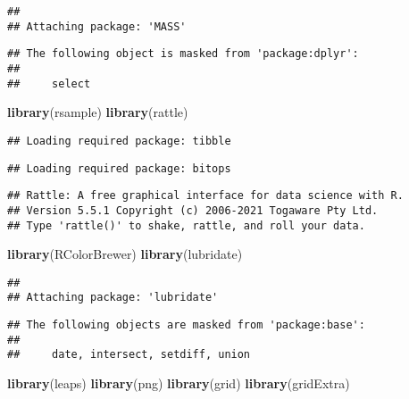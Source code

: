 \documentclass[
  a3paper,
]{article}
\newenvironment{Shaded}{\begin{snugshade}}{\end{snugshade}}
\newcommand{\FunctionTok}[1]{\textcolor[rgb]{0.13,0.29,0.53}{\textbf{#1}}}
\newcommand{\NormalTok}[1]{#1}
\begin{document}
\begin{verbatim}
## 
## Attaching package: 'MASS'
\end{verbatim}

\begin{verbatim}
## The following object is masked from 'package:dplyr':
## 
##     select
\end{verbatim}

\begin{Shaded}
\begin{Highlighting}[]
\FunctionTok{library}\NormalTok{(rsample)}
\FunctionTok{library}\NormalTok{(rattle)}
\end{Highlighting}
\end{Shaded}

\begin{verbatim}
## Loading required package: tibble
\end{verbatim}

\begin{verbatim}
## Loading required package: bitops
\end{verbatim}

\begin{verbatim}
## Rattle: A free graphical interface for data science with R.
## Version 5.5.1 Copyright (c) 2006-2021 Togaware Pty Ltd.
## Type 'rattle()' to shake, rattle, and roll your data.
\end{verbatim}

\begin{Shaded}
\begin{Highlighting}[]
\FunctionTok{library}\NormalTok{(RColorBrewer)}
\FunctionTok{library}\NormalTok{(lubridate)}
\end{Highlighting}
\end{Shaded}

\begin{verbatim}
## 
## Attaching package: 'lubridate'
\end{verbatim}

\begin{verbatim}
## The following objects are masked from 'package:base':
## 
##     date, intersect, setdiff, union
\end{verbatim}

\begin{Shaded}
\begin{Highlighting}[]
\FunctionTok{library}\NormalTok{(leaps)}
\FunctionTok{library}\NormalTok{(png)}
\FunctionTok{library}\NormalTok{(grid)}
\FunctionTok{library}\NormalTok{(gridExtra)}
\end{Highlighting}
\end{Shaded}
\end{document}
